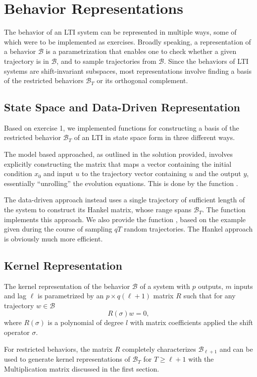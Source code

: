 \documentclass[11pt]{article}
\def\B{\mathscr{B}}
\begin{document}
\section{Behavior Representations}
The behavior of an LTI system can be represented in multiple ways, some of which were to be implemented as exercises. Broadly speaking, a representation of a behavior $\B$ is a parametrization that enables one to check whether a given trajectory is in $\B$, and to sample trajectories from $\B$. Since the behaviors of LTI systems are shift-invariant subspaces, most representations involve finding a basis of the restricted behaviors $\B_T$ or its orthogonal complement.

\subsection*{State Space and Data-Driven Representation}
Based on exercise 1, we implemented functions for constructing a basis of the restricted behavior $\B_T$ of an LTI in state space form in three different ways.

The model based approached, as outlined in the solution provided, involves explicitly constructing the matrix that maps a vector containing the initial condition $x_0$ and input $u$ to the trajectory vector containing $u$ and the output $y$, essentially ``unrolling'' the evolution equations. This is done by the function .

The data-driven approach instead uses a single trajectory of sufficient length of the system to construct its Hankel matrix, whose range spans $\B_T$. The function  implements this approach. We also provide the function , based on the example given during the course of sampling $qT$ random trajectories. The Hankel approach is obviously much more efficient.

\subsection*{Kernel Representation}
The kernel representation of the behavior $\B$ of a system with $p$ outputs, $m$ inputs and lag $\ell$ is parametrized by an $p \times q(\ell + 1)$ matrix $R$ such that for any trajectory $w \in \B$
$$ R(\sigma) w = 0, $$
where $R(\sigma)$ is a polynomial of degree $l$ with matrix coefficients applied the shift operator $\sigma$.

For restricted behaviors, the matrix $R$ completely characterizes $\B_{\ell+1}$ and can be used to generate kernel representations of $\B_T$ for $T \ge \ell +1$ with the Multiplication matrix discussed in the first section.
\end{document}
